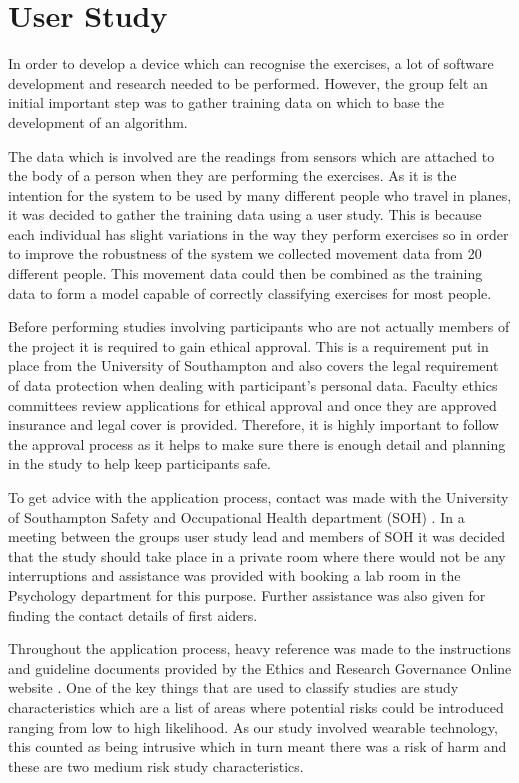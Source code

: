 \chapter{User Study}\label{chap:study}
In order to develop a device which can recognise the exercises, a lot of software development and research needed to be performed. However, the group felt an initial important step was to gather training data on which to base the development of an algorithm.

The data which is involved are the readings from sensors which are attached to the body of a person when they are performing the exercises. As it is the intention for the system to be used by many different people who travel in planes, it was decided to gather the training data using a user study. This is because each individual has slight variations in the way they perform exercises so in order to improve the robustness of the system we collected movement data from 20 different people. This movement data could then be combined as the training data to form a model capable of correctly classifying exercises for most people.

Before performing studies involving participants who are not actually members of the project it is required to gain ethical approval. This is a requirement put in place from the University of Southampton and also covers the legal requirement of data protection when dealing with participant's personal data. Faculty ethics committees review applications for ethical approval and once they are approved insurance and legal cover is provided. Therefore, it is highly important to follow the approval process as it helps to make sure there is enough detail and planning in the study to help keep participants safe.

To get advice with the application process, contact was made with the University of Southampton Safety and Occupational Health department (SOH) \cite{sotonsoh}. In a meeting between the groups user study lead and members of SOH it was decided that the study should take place in a private room where there would not be any interruptions and assistance was provided with booking a lab room in the Psychology department for this purpose. Further assistance was also given for finding the contact details of first aiders.

Throughout the application process, heavy reference was made to the instructions and guideline documents provided by the Ethics and Research Governance Online website \cite{ergo}. One of the key things that are used to classify studies are study characteristics which are a list of areas where potential risks could be introduced ranging from low to high likelihood. As our study involved wearable technology, this counted as being intrusive which in turn meant there was a risk of harm and these are two medium risk study characteristics.

